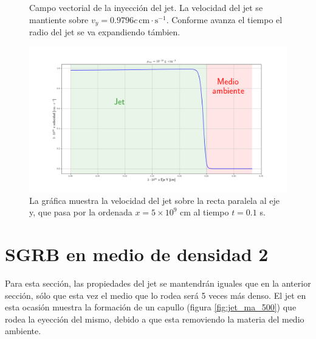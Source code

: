 \documentclass[12pt,a4paper]{book}
\begin{document}
\begin{figure}
\caption{\label{fig:campo_de_velocidades_medio_bajo} Campo vectorial de la inyección del jet. La velocidad del jet se mantiente sobre $v_{y} = 0.9796 c \, \mathrm{cm} \cdot \mathrm{s}^{-1}$. Conforme avanza el tiempo el radio del jet se va expandiendo támbien.}
\end{figure}

\begin{figure}
\centering
\includegraphics[scale=0.3]{./Figuras/velocidades_jet_capitulo4/vel_10_10}
\caption{\label{fig:vel_10_10} La gráfica muestra la velocidad del jet sobre la recta paralela al eje y, que pasa por la ordenada $x  = 5 \times 10^{9}$ cm al tiempo $t = 0.1$ s.}
\end{figure}



\section{SGRB en medio de densidad 2}

Para esta sección, las propiedades del jet se mantendrán iguales que en la anterior sección, sólo que esta vez el medio que lo rodea será 5 veces más denso. El jet en esta ocasión muestra la formación de un capullo (figura \ref{fig:jet_ma_500}) que rodea la eyección del mismo, debido a que esta removiendo la materia del medio ambiente. 
\end{document}
